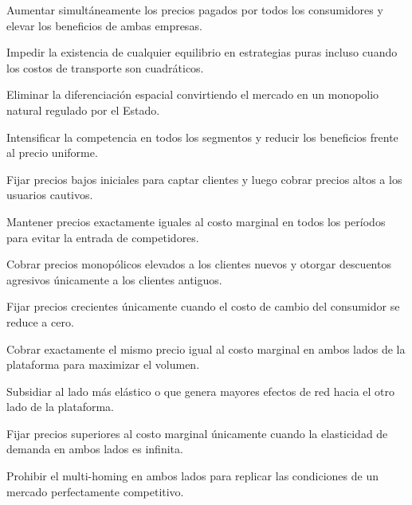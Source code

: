 \begin{opts}
    \item Aumentar simultáneamente los precios pagados por todos los consumidores y elevar los beneficios de ambas empresas.
    \item Impedir la existencia de cualquier equilibrio en estrategias puras incluso cuando los costos de transporte son cuadráticos.
    \item Eliminar la diferenciación espacial convirtiendo el mercado en un monopolio natural regulado por el Estado.
    \item Intensificar la competencia en todos los segmentos y reducir los beneficios frente al precio uniforme.
\end{opts}

\begin{opts}
    \item Fijar precios bajos iniciales para captar clientes y luego cobrar precios altos a los usuarios cautivos.
    \item Mantener precios exactamente iguales al costo marginal en todos los períodos para evitar la entrada de competidores.
    \item Cobrar precios monopólicos elevados a los clientes nuevos y otorgar descuentos agresivos únicamente a los clientes antiguos.
    \item Fijar precios crecientes únicamente cuando el costo de cambio del consumidor se reduce a cero.
\end{opts}

\begin{opts}
    \item Cobrar exactamente el mismo precio igual al costo marginal en ambos lados de la plataforma para maximizar el volumen.
    \item Subsidiar al lado más elástico o que genera mayores efectos de red hacia el otro lado de la plataforma.
    \item Fijar precios superiores al costo marginal únicamente cuando la elasticidad de demanda en ambos lados es infinita.
    \item Prohibir el multi-homing en ambos lados para replicar las condiciones de un mercado perfectamente competitivo.
\end{opts}

